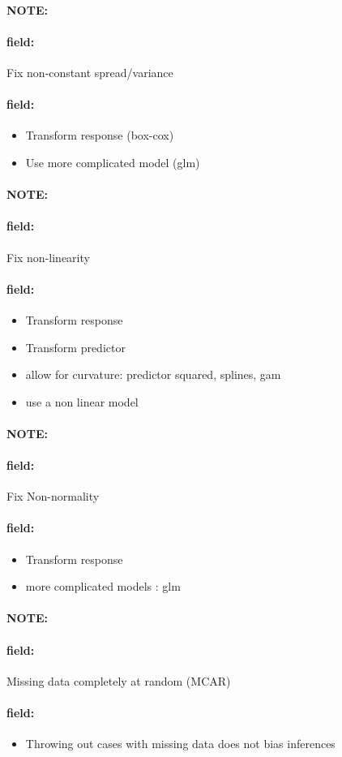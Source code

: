 \documentclass[12pt]{article}
\newenvironment{note}{\paragraph{NOTE:}}{}
\newenvironment{field}{\paragraph{field:}}{}
\begin{document}
\begin{note}
  \begin{field}
    Fix non-constant spread/variance
  \end{field}
  \begin{field}
    \begin{itemize}
      \item Transform response (box-cox)
      \item Use more complicated model (glm)
    \end{itemize}
  \end{field}
\end{note}

\begin{note}
  \begin{field}
    Fix non-linearity
  \end{field}
  \begin{field}
    \begin{itemize}
      \item Transform response
      \item Transform predictor
      \item allow for curvature: predictor squared, splines, gam
      \item use a non linear model
    \end{itemize}
  \end{field}
\end{note}

\begin{note}
  \begin{field}
    Fix Non-normality
  \end{field}
  \begin{field}
    \begin{itemize}
      \item Transform response
      \item more complicated models : glm
    \end{itemize}
  \end{field}
\end{note}

\begin{note}
  \begin{field}
    Missing data completely at random (MCAR)
  \end{field}
  \begin{field}
    \begin{itemize}
      \item Throwing out cases with missing data does not bias inferences
    \end{itemize}
  \end{field}
\end{note}
\end{document}
